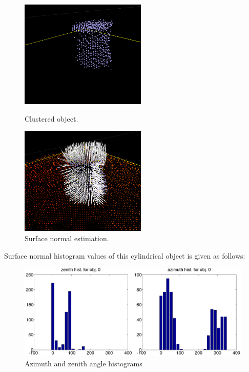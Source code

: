 \documentclass[runningheads,a4paper]{llncs}
\begin{document}
\begin{figure}[ht]
\begin{minipage}[b]{0.5\linewidth}
\centering
\includegraphics[width=60mm]{imgs/object_cluster.png}
\caption{Clustered object.}
\label{fig:ids}
\end{minipage}
\hspace{0.5cm}
\begin{minipage}[b]{0.5\linewidth}
\centering
\includegraphics[width=60mm]{imgs/surface_normals.png}
\caption{Surface normal estimation. }
\label{fig:rxgraph}
\end{minipage}
\end{figure}

Surface normal histogram values of this cylindrical object is given as follows:

\begin{figure}[ht]
\centering
\includegraphics[width=140mm]{imgs/untitled.png}
\caption{Azimuth and zenith angle histograms }
\label{fig:rxgraph}
\end{figure}
\end{document}
